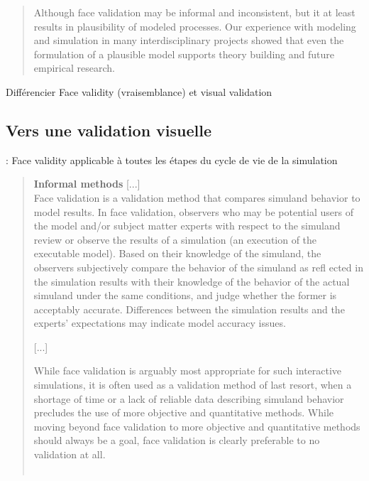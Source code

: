 \begin{quotation}
\og Although face validation may be informal and inconsistent, but it at least results in plausibility of modeled processes. Our experience with modeling and simulation in many interdisciplinary projects showed that even the formulation of a plausible model supports theory building and future empirical research.\fg{}
\mbox{}~ \hfill \cite[43]{klugl_validation_2008}
\end{quotation}





Différencier Face validity (vraisemblance) et visual validation

\subsection{Vers une validation visuelle}

\cite[Table 3, p. 46]{balci1998verification} : Face validity applicable à toutes les étapes du cycle de vie de la simulation

\begin{quotation}
		\textbf{Informal methods} [...]\\
		\og Face validation is a validation method that compares simuland behavior to model results. In face validation, observers who may be potential  users  of  the  model  and/or  subject  matter  experts  with  respect  to  the  simuland  review  or  observe  the  results  of  a  simulation  (an  execution  of  the   executable model). Based on their knowledge of the simuland, the observers  subjectively compare the behavior of the simuland as refl ected in the simulation results with their knowledge of the behavior of the actual simuland under the  same  conditions,  and  judge  whether  the  former  is  acceptably  accurate. Differences  between  the  simulation  results  and  the  experts' expectations may indicate model accuracy issues.

		[...]

		While  face  validation  is  arguably  most  appropriate  for  such  interactive simulations, it is often used as a validation method of last resort, when a shortage of time or a lack of reliable data describing simuland behavior precludes the  use  of  more  objective  and  quantitative  methods.  While  moving  beyond face validation to more objective and quantitative methods should always be a goal, face validation is clearly preferable to no validation at all.\fg{}\\
	\mbox{}~ \hfill \cite[341-342;]{petty2010verification}
\end{quotation}




